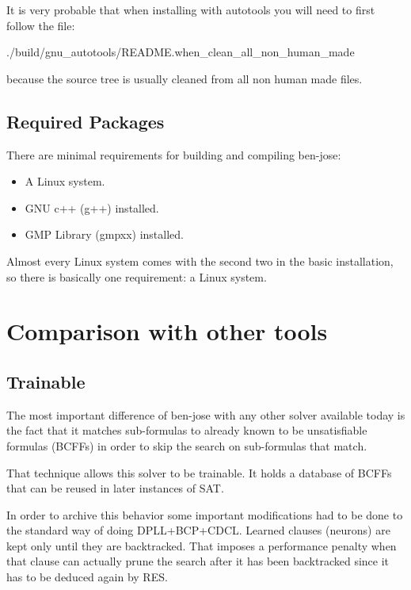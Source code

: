\documentclass{easychair}
\newcommand{\neuron}{\textsf{neuron}}
\begin{document}
It is very probable that when installing with autotools you will need to first follow the file:

	./build/gnu\_autotools/README.when\_clean\_all\_non\_human\_made

because the source tree is usually cleaned from all non human made files.

\subsection{Required Packages}

There are minimal requirements for building and compiling ben-jose:

\begin{itemize}
\item
A Linux system.

\item
GNU c++ (g++) installed.

\item
GMP Library (gmpxx) installed.
\end{itemize}

Almost every Linux system comes with the second two in the basic installation, so there is basically one requirement: a Linux system.

\section{Comparison with other tools}
\label{sect:comparison}

\subsection{Trainable}

The most important difference of ben-jose with any other solver available today is the fact that it matches sub-formulas to already known to be unsatisfiable formulas (BCFFs) in order to skip the search on sub-formulas that match.

That technique allows this solver to be trainable. It holds a database of BCFFs that can be reused in later instances of SAT.

In order to archive this behavior some important modifications had to be done to the standard way of doing DPLL+BCP+CDCL. Learned clauses ({\neuron}s) are kept only until they are backtracked. That imposes a performance penalty when that clause can actually prune the search after it has been backtracked since it has to be deduced again by RES.
\end{document}
